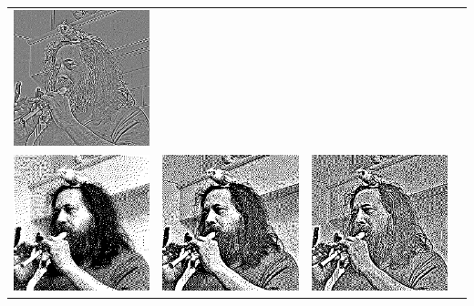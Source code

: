\begin{tabular}{llll}
	\includegraphics{weiro-riesz20.png} \\
	\includegraphics{weiro-diriesz01.png} &
	\includegraphics{weiro-diriesz05.png} &
	\includegraphics{weiro-diriesz10.png} &

\end{tabular}
